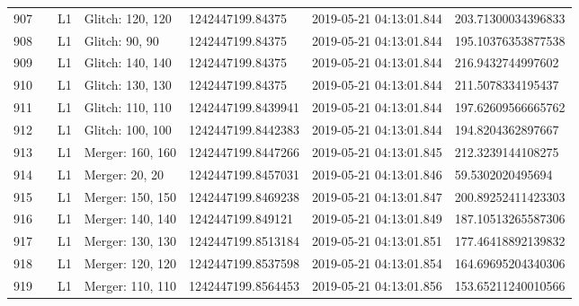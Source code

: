 \begin{longtable}{lllllll}
907  &                                                    &       L1 &  Glitch: 120, 120 &    1242447199.84375 &  2019-05-21 04:13:01.844 &  203.71300034396833 \\
908  &                                                    &       L1 &    Glitch: 90, 90 &    1242447199.84375 &  2019-05-21 04:13:01.844 &  195.10376353877538 \\
909  &                                                    &       L1 &  Glitch: 140, 140 &    1242447199.84375 &  2019-05-21 04:13:01.844 &   216.9432744997602 \\
910  &                                                    &       L1 &  Glitch: 130, 130 &    1242447199.84375 &  2019-05-21 04:13:01.844 &   211.5078334195437 \\
911  &                                                    &       L1 &  Glitch: 110, 110 &  1242447199.8439941 &  2019-05-21 04:13:01.844 &  197.62609566665762 \\
912  &                                                    &       L1 &  Glitch: 100, 100 &  1242447199.8442383 &  2019-05-21 04:13:01.844 &   194.8204362897667 \\
913  &                                                    &       L1 &  Merger: 160, 160 &  1242447199.8447266 &  2019-05-21 04:13:01.845 &   212.3239144108275 \\
914  &                                                    &       L1 &    Merger: 20, 20 &  1242447199.8457031 &  2019-05-21 04:13:01.846 &    59.5302020495694 \\
915  &                                                    &       L1 &  Merger: 150, 150 &  1242447199.8469238 &  2019-05-21 04:13:01.847 &  200.89252411423303 \\
916  &                                                    &       L1 &  Merger: 140, 140 &   1242447199.849121 &  2019-05-21 04:13:01.849 &  187.10513265587306 \\
917  &                                                    &       L1 &  Merger: 130, 130 &  1242447199.8513184 &  2019-05-21 04:13:01.851 &  177.46418892139832 \\
918  &                                                    &       L1 &  Merger: 120, 120 &  1242447199.8537598 &  2019-05-21 04:13:01.854 &  164.69695204340306 \\
919  &                                                    &       L1 &  Merger: 110, 110 &  1242447199.8564453 &  2019-05-21 04:13:01.856 &  153.65211240010566 \\

\end{longtable}
